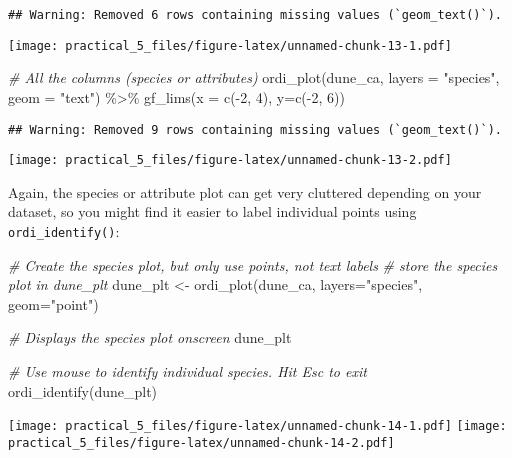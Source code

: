 \documentclass[
]{article}
\newenvironment{Shaded}{\begin{snugshade}}{\end{snugshade}}
\newcommand{\AttributeTok}[1]{\textcolor[rgb]{0.77,0.63,0.00}{#1}}
\newcommand{\CommentTok}[1]{\textcolor[rgb]{0.56,0.35,0.01}{\textit{#1}}}
\newcommand{\DecValTok}[1]{\textcolor[rgb]{0.00,0.00,0.81}{#1}}
\newcommand{\FunctionTok}[1]{\textcolor[rgb]{0.00,0.00,0.00}{#1}}
\newcommand{\NormalTok}[1]{#1}
\newcommand{\OtherTok}[1]{\textcolor[rgb]{0.56,0.35,0.01}{#1}}
\newcommand{\SpecialCharTok}[1]{\textcolor[rgb]{0.00,0.00,0.00}{#1}}
\newcommand{\StringTok}[1]{\textcolor[rgb]{0.31,0.60,0.02}{#1}}
\begin{document}
\begin{verbatim}
## Warning: Removed 6 rows containing missing values (`geom_text()`).
\end{verbatim}

\texttt{[image: practical\_5\_files/figure-latex/unnamed-chunk-13-1.pdf]}

\begin{Shaded}
\begin{Highlighting}[]
\CommentTok{\# All the columns (species or attributes)}
\FunctionTok{ordi\_plot}\NormalTok{(dune\_ca, }\AttributeTok{layers =} \StringTok{"species"}\NormalTok{, }\AttributeTok{geom =} \StringTok{"text"}\NormalTok{) }\SpecialCharTok{\%\textgreater{}\%} 
  \FunctionTok{gf\_lims}\NormalTok{(}\AttributeTok{x =} \FunctionTok{c}\NormalTok{(}\SpecialCharTok{{-}}\DecValTok{2}\NormalTok{, }\DecValTok{4}\NormalTok{), }\AttributeTok{y=}\FunctionTok{c}\NormalTok{(}\SpecialCharTok{{-}}\DecValTok{2}\NormalTok{, }\DecValTok{6}\NormalTok{))}
\end{Highlighting}
\end{Shaded}

\begin{verbatim}
## Warning: Removed 9 rows containing missing values (`geom_text()`).
\end{verbatim}

\texttt{[image: practical\_5\_files/figure-latex/unnamed-chunk-13-2.pdf]}

Again, the species or attribute plot can get very cluttered depending on
your dataset, so you might find it easier to label individual points
using \texttt{ordi\_identify()}:

\begin{Shaded}
\begin{Highlighting}[]
\CommentTok{\# Create the species plot, but only use points, not text labels}
\CommentTok{\# store the species plot in dune\_plt}
\NormalTok{dune\_plt }\OtherTok{\textless{}{-}} \FunctionTok{ordi\_plot}\NormalTok{(dune\_ca, }\AttributeTok{layers=}\StringTok{"species"}\NormalTok{, }\AttributeTok{geom=}\StringTok{"point"}\NormalTok{)}

\CommentTok{\# Displays the species plot onscreen}
\NormalTok{dune\_plt}

\CommentTok{\# Use mouse to identify individual species. Hit Esc to exit}
\FunctionTok{ordi\_identify}\NormalTok{(dune\_plt)}
\end{Highlighting}
\end{Shaded}

\texttt{[image: practical\_5\_files/figure-latex/unnamed-chunk-14-1.pdf]}
\texttt{[image: practical\_5\_files/figure-latex/unnamed-chunk-14-2.pdf]}
\end{document}
